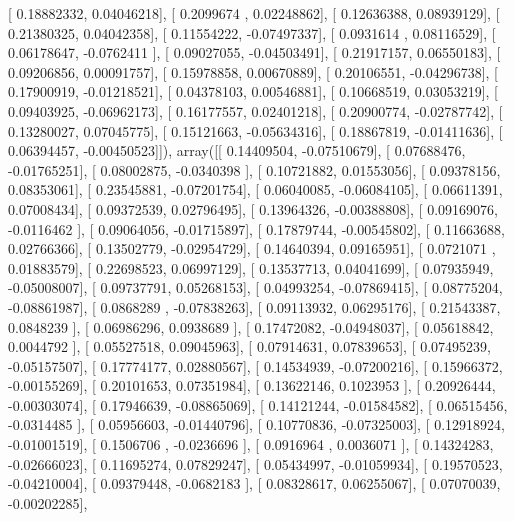 \documentclass{article}
\begin{document}
       [ 0.18882332,  0.04046218],
       [ 0.2099674 ,  0.02248862],
       [ 0.12636388,  0.08939129],
       [ 0.21380325,  0.04042358],
       [ 0.11554222, -0.07497337],
       [ 0.0931614 ,  0.08116529],
       [ 0.06178647, -0.0762411 ],
       [ 0.09027055, -0.04503491],
       [ 0.21917157,  0.06550183],
       [ 0.09206856,  0.00091757],
       [ 0.15978858,  0.00670889],
       [ 0.20106551, -0.04296738],
       [ 0.17900919, -0.01218521],
       [ 0.04378103,  0.00546881],
       [ 0.10668519,  0.03053219],
       [ 0.09403925, -0.06962173],
       [ 0.16177557,  0.02401218],
       [ 0.20900774, -0.02787742],
       [ 0.13280027,  0.07045775],
       [ 0.15121663, -0.05634316],
       [ 0.18867819, -0.01411636],
       [ 0.06394457, -0.00450523]]), array([[ 0.14409504, -0.07510679],
       [ 0.07688476, -0.01765251],
       [ 0.08002875, -0.0340398 ],
       [ 0.10721882,  0.01553056],
       [ 0.09378156,  0.08353061],
       [ 0.23545881, -0.07201754],
       [ 0.06040085, -0.06084105],
       [ 0.06611391,  0.07008434],
       [ 0.09372539,  0.02796495],
       [ 0.13964326, -0.00388808],
       [ 0.09169076, -0.0116462 ],
       [ 0.09064056, -0.01715897],
       [ 0.17879744, -0.00545802],
       [ 0.11663688,  0.02766366],
       [ 0.13502779, -0.02954729],
       [ 0.14640394,  0.09165951],
       [ 0.0721071 ,  0.01883579],
       [ 0.22698523,  0.06997129],
       [ 0.13537713,  0.04041699],
       [ 0.07935949, -0.05008007],
       [ 0.09737791,  0.05268153],
       [ 0.04993254, -0.07869415],
       [ 0.08775204, -0.08861987],
       [ 0.0868289 , -0.07838263],
       [ 0.09113932,  0.06295176],
       [ 0.21543387,  0.0848239 ],
       [ 0.06986296,  0.0938689 ],
       [ 0.17472082, -0.04948037],
       [ 0.05618842,  0.0044792 ],
       [ 0.05527518,  0.09045963],
       [ 0.07914631,  0.07839653],
       [ 0.07495239, -0.05157507],
       [ 0.17774177,  0.02880567],
       [ 0.14534939, -0.07200216],
       [ 0.15966372, -0.00155269],
       [ 0.20101653,  0.07351984],
       [ 0.13622146,  0.1023953 ],
       [ 0.20926444, -0.00303074],
       [ 0.17946639, -0.08865069],
       [ 0.14121244, -0.01584582],
       [ 0.06515456, -0.0314485 ],
       [ 0.05956603, -0.01440796],
       [ 0.10770836, -0.07325003],
       [ 0.12918924, -0.01001519],
       [ 0.1506706 , -0.0236696 ],
       [ 0.0916964 ,  0.0036071 ],
       [ 0.14324283, -0.02666023],
       [ 0.11695274,  0.07829247],
       [ 0.05434997, -0.01059934],
       [ 0.19570523, -0.04210004],
       [ 0.09379448, -0.0682183 ],
       [ 0.08328617,  0.06255067],
       [ 0.07070039, -0.00202285],
\end{document}
